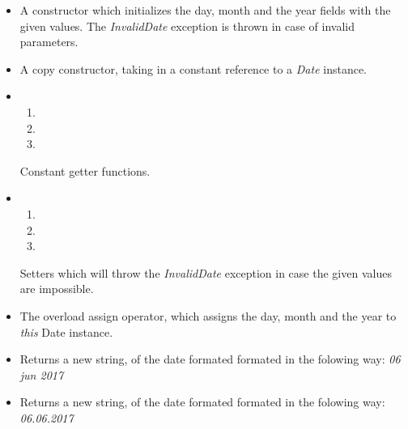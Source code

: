 \documentclass{article}
\begin{document}
			\begin{itemize}
				\item {}
					\par A constructor which initializes the day, month and the year fields with the given values. The \textit{InvalidDate} exception is thrown in case of invalid parameters.

				\item {}
					\par A copy constructor, taking in a constant reference to a \textit{Date} instance.

				\item
					\begin{enumerate}
						\item {}
						\item {}
						\item {}
					\end{enumerate}
					Constant getter functions.

				\item
					\begin{enumerate}
						\item {}
						\item {}
						\item {}
					\end{enumerate}
					Setters which will throw the \textit{InvalidDate} exception in case the given values are impossible.

				\item {}
					\par The overload assign operator, which assigns the day, month and the year to \textit{this} Date instance.

				\item {}
					\par Returns a new string, of the date formated formated in the folowing way: \textit{06 jun 2017}

				\item {}
					\par Returns a new string, of the date formated formated in the folowing way: \textit{06.06.2017}
			\end{itemize}
\end{document}
